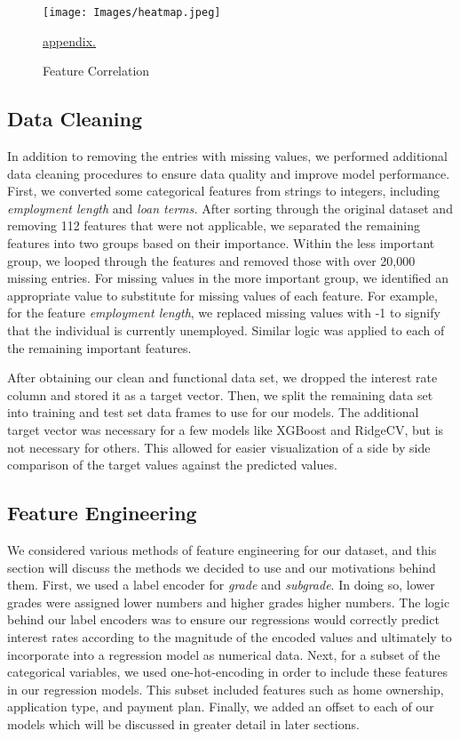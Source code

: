 \documentclass[twocolumn]{article}
\begin{document}
\begin{figure}[h]
\centering
\texttt{[image: Images/heatmap.jpeg]}
\caption{Feature Correlation}
\hyperref[sec:pseudo]{\underline{appendix.}}
\end{figure}

\subsection{Data Cleaning}
\par{\hspace{18}In addition to removing the entries with missing values, we performed additional data cleaning procedures to ensure data quality and improve model performance. First, we converted some categorical features from strings to integers, including \textit{employment length} and \textit{loan terms.} After sorting through the original dataset and removing 112 features that were not applicable, we separated the remaining features into two groups based on their importance. Within the less important group, we looped through the features and removed those with over 20,000 missing entries. For missing values in the more important group, we identified an appropriate value to substitute for missing values of each feature. For example, for the feature \textit{employment length}, we replaced missing values with -1 to signify that the individual is currently unemployed. Similar logic was applied to each of the remaining important features.  }
\par{After obtaining our clean and functional data set, we dropped the interest rate column and stored it as a target vector. Then, we split the remaining data set into training and test set data frames to use for our models. The additional target vector was necessary for a few models like XGBoost and RidgeCV, but is not necessary for others. This allowed for easier visualization of a side by side comparison of the target values against the predicted values.
}

\subsection{Feature Engineering}
\par{\hspace{18}We considered various methods of feature engineering for our dataset, and this section will discuss the methods we decided to use and our motivations behind them. First, we used a label encoder for \textit{grade} and \textit{subgrade}. In doing so, lower grades were assigned lower numbers and higher grades higher numbers. The logic behind our label encoders was to ensure our regressions would correctly predict interest rates according to the magnitude of the encoded values and ultimately to incorporate into a regression model as numerical data. Next, for a subset of the categorical variables, we used one-hot-encoding in order to include these features in our regression models. This subset included features such as home ownership, application type, and payment plan. Finally, we added an offset to each of our models which will be discussed in greater detail in later sections.} 
\end{document}

